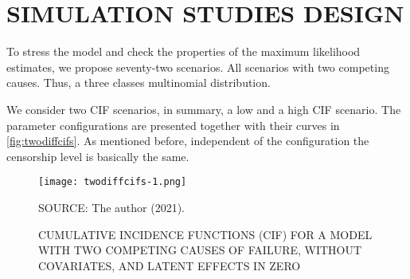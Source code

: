 \section{SIMULATION STUDIES DESIGN}
\label{cap:data}

To stress the model and check the properties of the maximum likelihood
estimates, we propose seventy-two scenarios. All scenarios with two
competing causes. Thus, a three classes multinomial distribution.

We consider two CIF scenarios, in summary, a low and a high CIF
scenario. The parameter configurations are presented together with their
curves in \autoref{fig:twodiffcifs}. As mentioned before, independent of
the configuration the censorship level is basically the same.

\begin{figure}[H]
 \setlength{\abovecaptionskip}{.0001pt}
 \caption{CUMULATIVE INCIDENCE FUNCTIONS (CIF) FOR A MODEL WITH TWO
          COMPETING CAUSES OF FAILURE, WITHOUT COVARIATES, AND LATENT
          EFFECTS IN ZERO}
 \vspace{0.2cm}\centering
 \texttt{[image: twodiffcifs-1.png]}\\
 \begin{footnotesize}
  SOURCE: The author (2021).
 \end{footnotesize}
 \label{fig:twodiffcifs}
\end{figure}

